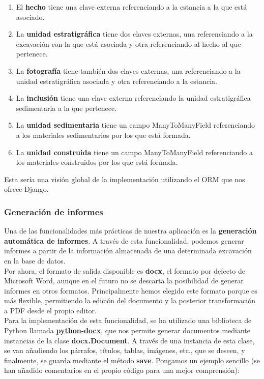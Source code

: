         \begin{enumerate}
            \item El \textbf{hecho} tiene una clave externa referenciando a la estancia a
            la que está asociado.
            \item La \textbf{unidad estratigráfica} tiene dos claves externas, una
            referenciando a la excavación con la que está asociada y otra referenciando al
            hecho al que pertenece.
            \item La \textbf{fotografía} tiene también dos claves externas, una
            referenciando a la unidad estratigráfica asociada y otra referenciando a la
            estancia.
            \item La \textbf{inclusión} tiene una clave externa referenciando la unidad
            estratigráfica sedimentaria a la que pertenece.
            \item La \textbf{unidad sedimentaria} tiene un campo ManyToManyField
            referenciando a los materiales sedimentarios por los que está formada.
            \item La \textbf{unidad construida} tiene un campo ManyToManyField referenciando a
            los materiales construidos por los que está formada.
        \end{enumerate}

    Esta sería una visión global de la implementación utilizando el ORM que nos ofrece Django.

\newpage \subsubsection{Generación de informes}
Una de las funcionalidades más prácticas de nuestra aplicación es la \textbf{generación
automática de informes}. A través de esta funcionalidad, podemos generar informes a partir
de la información almacenada de una determinada excavación en la base de datos. \\

Por ahora, el formato de salida disponible es \textbf{docx}, el formato por defecto de
Microsoft Word, aunque en el futuro no se descarta la posibilidad de generar informes
en otros formatos. Principalmente hemos elegido este formato porque es más flexible,
permitiendo la edición del documento y la posterior transformación a PDF desde el propio
editor. \\

Para la implementación de esta funcionalidad, se ha utilizado una biblioteca de Python
llamada \href{https://python-docx.readthedocs.io/en/latest/}{\textbf{python-docx}}, que nos
permite generar documentos mediante instancias de la clase \textbf{docx.Document}. A
través de una instancia de esta clase, se van añadiendo los párrafos, títulos, tablas,
imágenes, etc., que se deseen, y finalmente, se guarda mediante el método \textbf{save}.
Pongamos un ejemplo sencillo (se han añadido comentarios en el propio código para una mejor
comprensión):


